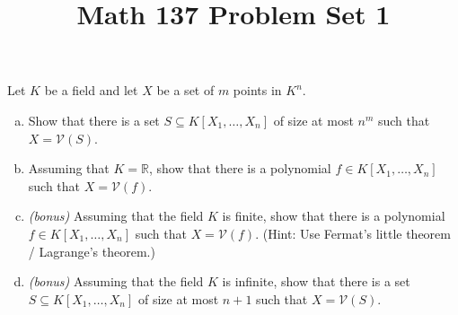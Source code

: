 \documentclass[11pt,letterpaper]{article}
\title{\textbf{Math 137 Problem Set 1}}
\begin{document}
\maketitle

\begin{problem}\noindent
  Let $K$ be a field and let $X$ be a set of $m$ points in $K^n$.
  \begin{enumerate}[(a)]
    \item Show that there is a set $S\subseteq K[X_1,\dots,X_n]$ of size at most $n^m$ such that $X=\mathcal V(S)$.
    \item Assuming that $K=\mathbb R$, show that there is a polynomial $f\in K[X_1,\dots,X_n]$ such that $X=\mathcal V(f)$.
    \item \emph{(bonus)} Assuming that the field $K$ is finite, show that there is a polynomial $f \in K[X_1,\dots,X_n]$ such that $X=\mathcal V(f)$. (Hint: Use Fermat's little theorem / Lagrange's theorem.)
    \item \emph{(bonus)} Assuming that the field $K$ is infinite, show that there is a set $S\subseteq K[X_1,\dots,X_n]$ of size at most $n+1$ such that $X=\mathcal V(S)$.
  \end{enumerate}
\end{problem}
\end{document}
